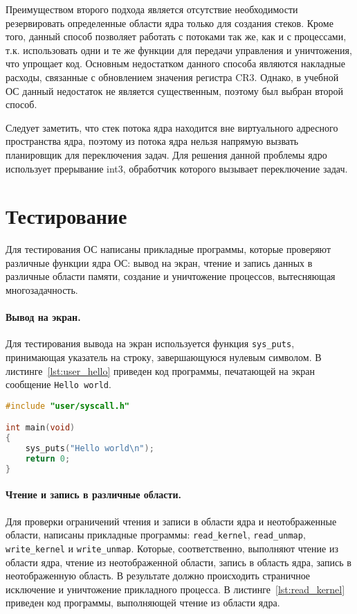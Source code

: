 Преимуществом второго подхода является отсутствие необходимости резервировать определенные
области ядра только для создания стеков. Кроме того, данный способ позволяет работать с потоками
так же, как и с процессами, т.к. использовать одни и те же функции для передачи управления и
уничтожения, что упрощает код. Основным недостатком данного способа являются накладные расходы,
связанные с обновлением значения регистра CR3. Однако, в учебной ОС данный недостаток не является
существенным, поэтому был выбран второй способ.

Следует заметить, что стек потока ядра находится вне виртуального адресного пространства ядра,
поэтому из потока ядра нельзя напрямую вызвать планировщик для переключения задач. Для решения данной
проблемы ядро использует прерывание int3, обработчик которого вызывает переключение задач.

\section{Тестирование}
Для тестирования ОС написаны прикладные программы, которые проверяют различные функции ядра ОС:
вывод на экран, чтение и запись данных в различные области памяти, создание и уничтожение
процессов, вытесняющая многозадачность.

\paragraph{Вывод на экран.} Для тестирования вывода на экран используется функция \texttt{sys\_puts},
принимающая указатель на строку, завершающуюся нулевым символом. В листинге~\ref{lst:user_hello} приведен
код программы, печатающей на экран сообщение \texttt{Hello world}.

\begin{lstlisting}[language=C, caption={Использование функции \texttt{sys\_puts}}, label={lst:user_hello}]
#include "user/syscall.h"

int main(void)
{
	sys_puts("Hello world\n");
	return 0;
}
\end{lstlisting}

\paragraph{Чтение и запись в различные области.} Для проверки ограничений чтения и записи в
области ядра и неотображенные области, написаны прикладные программы: \texttt{read\_kernel},
\texttt{read\_unmap}, \texttt{write\_kernel} и \texttt{write\_unmap}. Которые, соответственно,
выполняют чтение из области ядра, чтение из неотображенной области, запись в область ядра,
запись в неотображенную область. В результате должно происходить страничное исключение и
уничтожение прикладного процесса. В листинге~\ref{lst:read_kernel} приведен код программы,
выполняющей чтение из области ядра.

